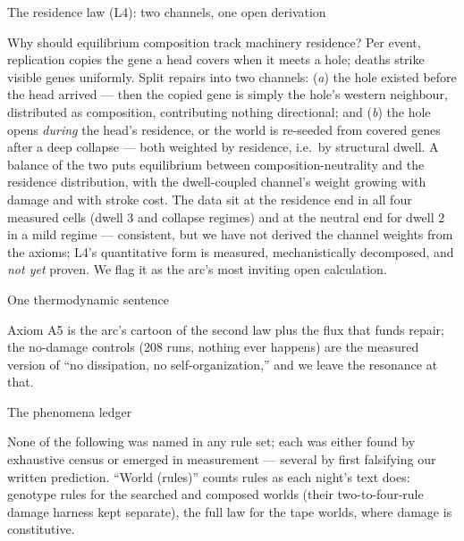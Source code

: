 \secc The residence law (L4): two channels, one open derivation

Why should equilibrium composition track machinery residence? Per
event, replication copies the gene a head covers when it meets a
hole; deaths strike visible genes uniformly. Split repairs into
two channels: ({\it a}) the hole existed before the head arrived
--- then the copied gene is simply the hole's western neighbour,
distributed as composition, contributing nothing directional; and
({\it b}) the hole opens {\it during} the head's residence, or the
world is re-seeded from covered genes after a deep collapse ---
both weighted by residence, i.e.\ by structural dwell. A balance
of the two puts equilibrium between composition-neutrality and the
residence distribution, with the dwell-coupled channel's weight
growing with damage and with stroke cost. The data sit at the
residence end in all four measured cells (dwell 3 and collapse
regimes) and at the neutral end for dwell 2 in a mild regime ---
consistent, but we have not derived the channel weights from the
axioms; L4's quantitative form is measured, mechanistically
decomposed, and {\it not yet} proven. We flag it as the arc's most
inviting open calculation.

\secc One thermodynamic sentence

Axiom A5 is the arc's cartoon of the second law plus the flux that
funds repair; the no-damage controls (208 runs, nothing ever
happens) are the measured version of “no dissipation, no
self-organization,” and we leave the resonance at that.

\sec The phenomena ledger

None of the following was named in any rule set; each was either
found by exhaustive census or emerged in measurement --- several
by first falsifying our written prediction. “World (rules)”
counts rules as each night's text does: genotype rules for the
searched and composed worlds (their two-to-four-rule damage harness
kept separate), the full law for the tape worlds, where damage is
constitutive.

